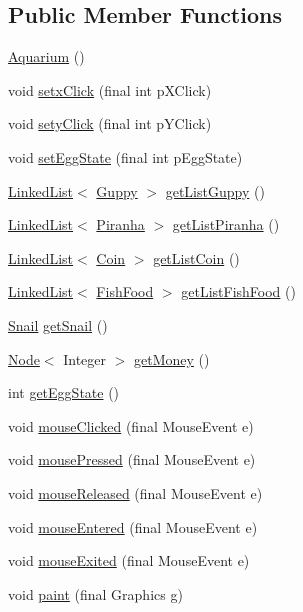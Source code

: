 \subsection*{Public Member Functions}
\begin{DoxyCompactItemize}
\item 
\mbox{\hyperlink{class_aquarium_a173f8b85de9d2f61c02d13ebdc05026c}{Aquarium}} ()
\item 
void \mbox{\hyperlink{class_aquarium_a534d2ac777989cb7b69167ca19d3c89e}{setx\+Click}} (final int p\+X\+Click)
\item 
void \mbox{\hyperlink{class_aquarium_a13fca2e9f118bbc3a150e22c72a5eeb7}{sety\+Click}} (final int p\+Y\+Click)
\item 
void \mbox{\hyperlink{class_aquarium_a2f943847eaa591471bd6d50dd17989f5}{set\+Egg\+State}} (final int p\+Egg\+State)
\item 
\mbox{\hyperlink{class_linked_list}{Linked\+List}}$<$ \mbox{\hyperlink{class_guppy}{Guppy}} $>$ \mbox{\hyperlink{class_aquarium_ac0ff36aa463290ad45aff4faf6889056}{get\+List\+Guppy}} ()
\item 
\mbox{\hyperlink{class_linked_list}{Linked\+List}}$<$ \mbox{\hyperlink{class_piranha}{Piranha}} $>$ \mbox{\hyperlink{class_aquarium_a168600416b33739a5943f44932325c29}{get\+List\+Piranha}} ()
\item 
\mbox{\hyperlink{class_linked_list}{Linked\+List}}$<$ \mbox{\hyperlink{class_coin}{Coin}} $>$ \mbox{\hyperlink{class_aquarium_ad7e90e4a2cd4a8810dfd497ba0f5375f}{get\+List\+Coin}} ()
\item 
\mbox{\hyperlink{class_linked_list}{Linked\+List}}$<$ \mbox{\hyperlink{class_fish_food}{Fish\+Food}} $>$ \mbox{\hyperlink{class_aquarium_a1bdc2bc59b49bd0c09aed6a51552d5f2}{get\+List\+Fish\+Food}} ()
\item 
\mbox{\hyperlink{class_snail}{Snail}} \mbox{\hyperlink{class_aquarium_ac00cb1b361c2b368370f3fd1225ff296}{get\+Snail}} ()
\item 
\mbox{\hyperlink{class_node}{Node}}$<$ Integer $>$ \mbox{\hyperlink{class_aquarium_aed777455bcb78b66ee3908b8be819372}{get\+Money}} ()
\item 
int \mbox{\hyperlink{class_aquarium_a081f2e1e4de0b98da501d2d067a3de0a}{get\+Egg\+State}} ()
\item 
void \mbox{\hyperlink{class_aquarium_a07837c9e2cd6167a3fbe4dfee5a1bda9}{mouse\+Clicked}} (final Mouse\+Event e)
\item 
void \mbox{\hyperlink{class_aquarium_a8f9a90754361531477cb8f13e2ebeeb4}{mouse\+Pressed}} (final Mouse\+Event e)
\item 
void \mbox{\hyperlink{class_aquarium_a9aa66d2632438550a97327f32f30e36d}{mouse\+Released}} (final Mouse\+Event e)
\item 
void \mbox{\hyperlink{class_aquarium_a5c7c79153603cb43ef13029f1a6f69a7}{mouse\+Entered}} (final Mouse\+Event e)
\item 
void \mbox{\hyperlink{class_aquarium_a7bb467907d03033dd70195526ae85b21}{mouse\+Exited}} (final Mouse\+Event e)
\item 
void \mbox{\hyperlink{class_aquarium_a5ea05fb764eeba71972deb3eb0fe6140}{paint}} (final Graphics g)
\end{DoxyCompactItemize}
